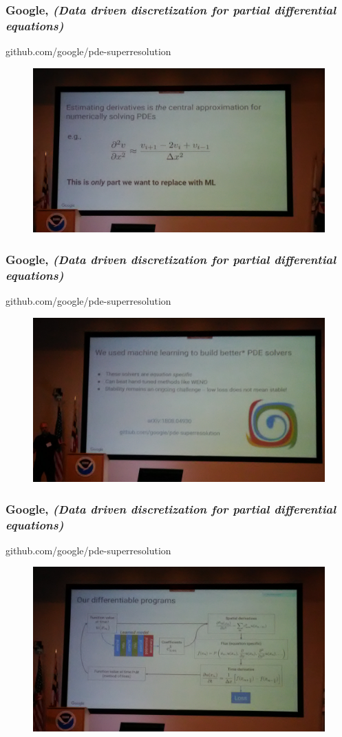 \documentclass{beamer}
\begin{document}
\begin{frame}
\frametitle{Google, \textit{(Data driven discretization for partial differential equations)}}
github.com/google/pde-superresolution
\begin{figure}
	\includegraphics[width=.9\linewidth]{figs/P_20190424_154437.jpg}
\end{figure}
\end{frame}

\begin{frame}
\frametitle{Google, \textit{(Data driven discretization for partial differential equations)}}
github.com/google/pde-superresolution
\begin{figure}
	\includegraphics[width=.9\linewidth]{figs/P_20190424_155240.jpg}
\end{figure}
\end{frame}

\begin{frame}
\frametitle{Google, \textit{(Data driven discretization for partial differential equations)}}
github.com/google/pde-superresolution
\begin{figure}
	\includegraphics[width=.9\linewidth]{figs/P_20190424_155515.jpg}
\end{figure}
\end{frame}
\end{document}
